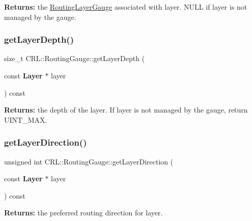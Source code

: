 {\bfseries Returns\+:} the \hyperlink{classCRL_1_1RoutingLayerGauge}{Routing\+Layer\+Gauge} associated with {\ttfamily layer}. N\+U\+LL if {\ttfamily layer} is not managed by the gauge. \mbox{\label{classCRL_1_1RoutingGauge_ac429c6ad1b2af7c588c60eff35c2d02e}} 
\subsubsection{\texorpdfstring{get\+Layer\+Depth()}{getLayerDepth()}}
{\footnotesize\ttfamily size\+\_\+t C\+R\+L\+::\+Routing\+Gauge\+::get\+Layer\+Depth (\begin{DoxyParamCaption}\item[{const \textbf{ Layer} $\ast$}]{layer }\end{DoxyParamCaption}) const}

{\bfseries Returns\+:} the depth of the {\ttfamily layer}. If {\ttfamily layer} is not managed by the gauge, return U\+I\+N\+T\+\_\+\+M\+AX. \mbox{\label{classCRL_1_1RoutingGauge_ac553c4dc3f51576a3128ad42d5a006b2}} 
\subsubsection{\texorpdfstring{get\+Layer\+Direction()}{getLayerDirection()}\hspace{0.1cm}{\footnotesize\ttfamily [1/2]}}
{\footnotesize\ttfamily unsigned int C\+R\+L\+::\+Routing\+Gauge\+::get\+Layer\+Direction (\begin{DoxyParamCaption}\item[{const \textbf{ Layer} $\ast$}]{layer }\end{DoxyParamCaption}) const}

{\bfseries Returns\+:} the preferred routing direction for {\ttfamily layer}. \mbox{\label{classCRL_1_1RoutingGauge_a1b6d28bbee28db727ffe13e6205dbae8}} 
